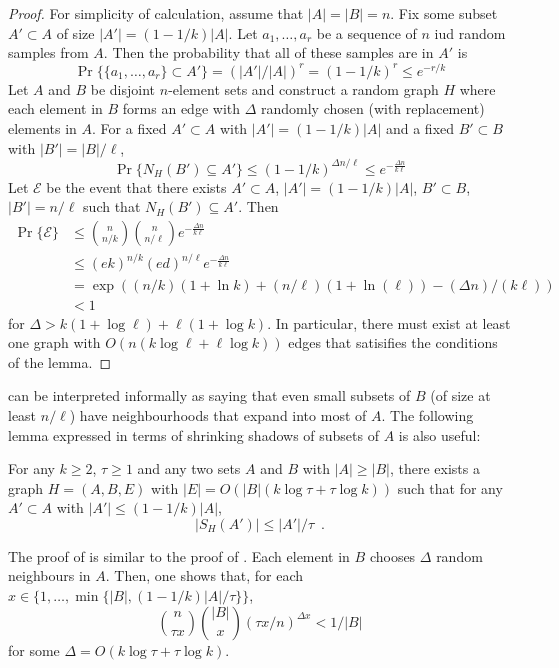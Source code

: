 \documentclass{patmorin}
\begin{document}
\begin{proof}
  For simplicity of calculation, assume that $|A|=|B|=n$.  Fix some
  subset $A'\subset A$ of size $|A'|=(1-1/k)|A|$.  Let $a_1,\ldots,a_r$
  be a sequence of $n$ iud random samples from $A$.  Then the probability
  that all of these samples are in $A'$ is
  \[
     \Pr\{\{a_1,\ldots,a_r\}\subset A'\} = (|A'|/|A|)^r = (1-1/k)^r \le e^{-r/k}
  \]
  Let $A$ and $B$ be disjoint $n$-element sets and construct a random
  graph $H$ where each element in $B$ forms an edge with $\Delta$ randomly
  chosen (with replacement) elements in $A$.  For a fixed $A'\subset A$
  with $|A'|=(1-1/k)|A|$ and a fixed $B'\subset B$ with $|B'| = |B|/\ell$,
  \[
    \Pr\{N_H(B') \subseteq A'\} 
        \le (1-1/k)^{\Delta n/\ell} 
        \le e^{-\frac{\Delta n}{k\ell}}
  \]
  Let $\mathcal{E}$ be the event that there exists $A'\subset A$, $|A'|=(1-1/k)|A|$, $B'\subset B$, $|B'|=n/\ell$ such that $N_H(B')\subseteq A'$.  Then
  \begin{align*}
    \Pr\{\mathcal{E}\} 
        & \le \binom{n}{n/k}\binom{n}{n/\ell}e^{-\frac{\Delta n}{k\ell}} \\
        & \le (ek)^{n/k} (ed)^{n/\ell}e^{-\frac{\Delta n}{k\ell}} \\
        & = \exp((n/k)(1+\ln k) + (n/\ell)(1+\ln(\ell)) - (\Delta n)/(k\ell)) \\
        & < 1
  \end{align*}
  for $\Delta > k(1+\log \ell) + \ell(1+\log k)$.  In particular, there
  must exist at least one graph with $O(n(k\log\ell + \ell\log k))$
  edges that satisifies the conditions of the lemma.
\end{proof}

 can be interpreted informally as saying that even small
subsets of $B$ (of size at least $n/\ell$) have neighbourhoods that
expand into most of $A$.  The following lemma expressed in terms of
shrinking shadows of subsets of $A$ is also useful:

\begin{lem}
   For any $k\ge 2$, $\tau\ge 1$ and any two sets $A$ and $B$ with $|A|\ge|B|$,
   there exists a graph $H=(A,B,E)$
   with $|E|=O(|B|(k\log \tau + \tau\log k))$ such that
   for any $A'\subset A$ with $|A'|\le (1-1/k)|A|$, 
   \[ |S_H(A')| \le |A'|/\tau \enspace .\]
\end{lem}

The proof of  is similar to the proof of .
Each element in $B$ chooses $\Delta$ random neighbours in $A$.  Then, one shows that, for each $x\in\{1,\ldots,\min\{|B|, (1-1/k)|A|/\tau\}\}$,
\[
    \binom{n}{\tau x}\binom{|B|}{x}(\tau x/n)^{\Delta x} < 1/|B|
\]
for some $\Delta=O(k\log\tau +\tau\log k)$.
\end{document}
